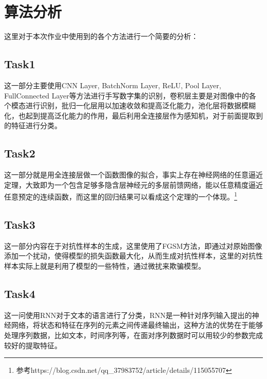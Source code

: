 \documentclass[UTF8]{ctexart}
\begin{document}
\section{算法分析}

这里对于本次作业中使用到的各个方法进行一个简要的分析：

\subsection{Task1}

这一部分主要使用CNN Layer, BatchNorm Layer, ReLU, Pool Layer, FullConnected Layer等方法进行手写数字集的识别，卷积层主要是对图像中的各个模态进行识别，批归一化层用以加速收敛和提高泛化能力，池化层将数据模糊化，也起到提高泛化能力的作用，最后利用全连接层作为感知机，对于前面提取到的特征进行分类。

\subsection{Task2}

这一部分就是用全连接层做一个函数图像的拟合，事实上存在神经网络的任意逼近定理，大致即为一个包含足够多隐含层神经元的多层前馈网络，能以任意精度逼近任意预定的连续函数，而这里的回归结果可以看成这个定理的一个体现。\footnote{参考https://blog.csdn.net/qq\_37983752/article/details/115055707}
\subsection{Task3}

这一部分内容在于对抗性样本的生成，这里使用了FGSM方法，即通过对原始图像添加一个扰动，使得模型的损失函数最大化，从而生成对抗性样本，这里的对抗性样本实际上就是利用了模型的一些特性，通过微扰来欺骗模型。

\subsection{Task4}

这一问使用RNN对于文本的语言进行了分类，RNN是一种针对序列输入提出的神经网络，将状态和特征在序列的元素之间传递最终输出，这种方法的优势在于能够处理序列数据，比如文本，时间序列等，在面对序列数据时可以用较少的参数完成较好的提取特征。
\end{document}
